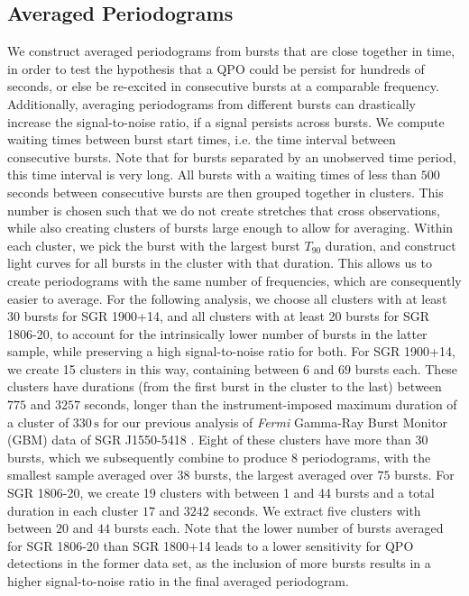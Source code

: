 \documentclass[numberedappendix]{emulateapj}
\begin{document}
\subsection{Averaged Periodograms}
\label{sec:psd_average}
We construct averaged periodograms from bursts that are close together in time, in order to test the hypothesis that a QPO could be persist for hundreds of seconds, or else be re-excited in consecutive bursts at a comparable frequency. Additionally, averaging periodograms from different bursts can drastically increase the signal-to-noise ratio, if a signal persists across bursts. We compute waiting times between burst start times, i.e. the time interval between consecutive bursts. Note that for bursts separated by an unobserved time period, this time interval is very long. All bursts with a waiting times of less than $500$ seconds between consecutive bursts are then grouped together in clusters. This number is chosen such that we do not create stretches that cross observations, while also creating clusters of bursts large enough to allow for averaging. Within each cluster, we pick the burst with the largest burst $T_{90}$ duration, and construct light curves for all bursts in the cluster with that duration. This allows us to create periodograms with the same number of frequencies, which are consequently easier to average. For the following analysis, we choose all clusters with at least 30 bursts for SGR 1900+14, and all clusters with at least 20 bursts for SGR 1806-20, to account for the intrinsically lower number of bursts in the latter sample, while preserving a high signal-to-noise ratio for both.
For SGR 1900+14, we create 15 clusters in this way, containing between $6$ and $69$ bursts each. These clusters have durations (from the first burst in the cluster to the last) between $775$ and $3257$ seconds, longer than the instrument-imposed maximum duration of a cluster of $330 \, \mathrm{s}$ for our previous analysis of {\it Fermi} Gamma-Ray Burst Monitor (GBM) data of SGR J1550-5418 \citep{huppenkothen2014}. Eight of these clusters have more than $30$ bursts, which we subsequently combine to produce 8 periodograms, with the smallest sample averaged over $38$ bursts, the largest averaged over $75$ bursts.
For SGR 1806-20, we create 19 clusters with between 1 and 44 bursts and a total duration in each cluster $17$ and $3242$ seconds. We extract five clusters with between $20$ and $44$ bursts each. Note that the lower number of bursts averaged for SGR 1806-20 than SGR 1800+14 leads to a lower sensitivity for QPO detections in the former data set, as the inclusion of more bursts results in a higher signal-to-noise ratio in the final averaged periodogram.
\end{document}
